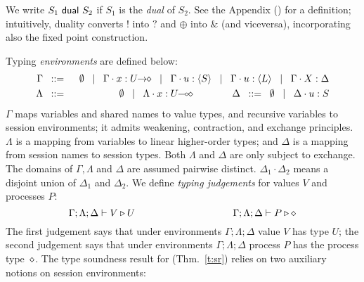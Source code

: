 
We write $S_1 \ \mathsf{dual}\  S_2$ if 
$S_1$ is the \emph{dual} of $S_2$.   
See the Appendix () for a definition; 
intuitively, 
duality
converts $!$ into $?$ and $\oplus$ into $\&$ (and viceversa),  
incorporating also the fixed point construction.

\smallskip 

\noi Typing \emph{environments} are defined below:
\begin{eqnarray*}
	\Gamma  & \bnfis  &\emptyset \bnfbar \Gamma \cat \varp{x}: \shot{U} \bnfbar \Gamma \cat u: \chtype{S} \bnfbar \Gamma \cat u: \chtype{L} 
        \bnfbar \Gamma \cat \rvar{X}: \Delta \\
	\Lambda &\bnfis & \emptyset \bnfbar \Lambda \cat \AT{x}{\lhot{U}}
	\qquad\qquad
	\Delta  \bnfis  \emptyset \bnfbar \Delta \cat \AT{u}{S}
\end{eqnarray*}
\noi 
$\Gamma$ maps variables and shared names to value types, and recursive 
variables to session environments;  
it admits weakening, contraction, and exchange principles.
$\Lambda$ is a mapping from variables to 
 linear %
higher-order
types; and $\Delta$ is a mapping from 
session names to session types. 
Both $\Lambda$ and $\Delta$ %
are
only subject to exchange.  
The domains of $\Gamma,
\Lambda$ and $\Delta$ are assumed pairwise distinct. 
$\Delta_1\cdot \Delta_2$ means 
a disjoint union of $\Delta_1$ and $\Delta_2$.  
We define \emph{typing judgements} for values $V$
and processes $P$:
	$$\Gamma; \Lambda; \Delta \vdash V \triangleright U \qquad \qquad \qquad \qquad \qquad \Gamma; \Lambda; \Delta \vdash P \triangleright \diamond$$
\noi The first judgement
says that under environments $\Gamma; \Lambda; \Delta$ value $V$
has type $U$; the second judgement says that under
environments $\Gamma; \Lambda; \Delta$ process $P$ has the process type~$\diamond$.
The type soundness result for \HOp (Thm.~\ref{t:sr})
relies on two auxiliary notions on session environments: 


